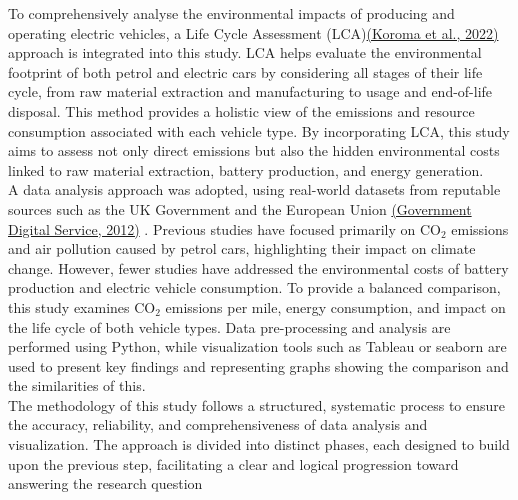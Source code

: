 To comprehensively analyse the environmental impacts of producing and operating electric vehicles, a Life Cycle Assessment (LCA)\href{https://www.sciencedirect.com/science/article/pii/S0048969722019520}{(Koroma et al., 2022)} approach is integrated into this study. LCA  helps evaluate the environmental footprint of both petrol and electric cars by considering all stages of their life cycle, from raw material extraction and manufacturing to usage and end-of-life disposal. This method provides a holistic view of the emissions and resource consumption associated with each vehicle type. By incorporating LCA, this study aims to assess not only direct emissions but also the hidden environmental costs linked to raw material extraction, battery production, and energy generation. \\
 
 A data analysis approach was adopted, using real-world datasets from
reputable sources such as the UK Government and the European Union \href{https://www.gov.uk/co2-and-vehicle-tax-tools}{(Government Digital Service, 2012)} . Previous studies have focused primarily on CO$_2$ emissions and air pollution caused by petrol cars, highlighting their impact on climate change.
 However, fewer studies have addressed the environmental costs of battery production and electric vehicle consumption. To provide a balanced comparison, this study examines
CO$_2$ emissions per mile, energy consumption, and impact on the life cycle of both vehicle types.
Data pre-processing and analysis are performed using Python, while visualization tools such
as Tableau or seaborn are used to present key findings and representing graphs showing the comparison and 
the similarities of this. \\

The methodology of this study follows a structured, systematic process to ensure the accuracy, reliability, and comprehensiveness of data analysis and visualization. The approach is divided into distinct phases, each designed to build upon the previous step, facilitating a clear and logical progression toward answering the research question
\clearpage


\clearpage
 


